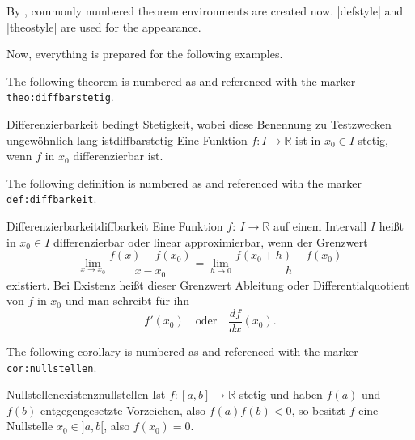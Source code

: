 
By , commonly numbered theorem environments are
created now. |defstyle| and |theostyle| are used for the appearance.

Now, everything is prepared for the following examples.

\begin{dispExample}
The following theorem is numbered as  and
referenced with the marker \texttt{theo:diffbarstetig}.

\begin{Theorem}{Differenzierbarkeit bedingt Stetigkeit, wobei diese Benennung
  zu Testzwecken ungew\"{o}hnlich lang ist}{diffbarstetig}%
  Eine Funktion $f:I\to\mathbb{R}$ ist in $x_0\in I$ stetig, wenn $f$ in
  $x_0$ differenzierbar ist.
\end{Theorem}
\end{dispExample}


\begin{dispExample}
The following definition is numbered as  and
referenced with the marker \texttt{def:diffbarkeit}.\bigskip

\begin{Definition}{Differenzierbarkeit}{diffbarkeit}
  Eine Funktion $f:~I\to\mathbb{R}$ auf einem Intervall $I$ hei\ss{}t in
  $x_0\in I$ differenzierbar oder linear approximierbar,
  wenn der Grenzwert
  \begin{equation*}
  \lim\limits_{x\to x_0}\frac{f(x)-f(x_0)}{x-x_0}=
  \lim\limits_{h\to 0}\frac{f(x_0+h)-f(x_0)}{h}
  \end{equation*}
  existiert. Bei Existenz hei\ss{}t dieser Grenzwert Ableitung
  oder Differentialquotient von $f$ in $x_0$ und man
  schreibt f\"{u}r ihn
  \begin{equation*}
  f'(x_0)\quad\text{oder}\quad\frac{df}{dx}(x_0).
  \end{equation*}
\end{Definition}
\end{dispExample}


\begin{dispExample}
The following corollary is numbered as  and
referenced with the marker \texttt{cor:nullstellen}.\bigskip

\begin{Corollary}{Nullstellenexistenz}{nullstellen}
  Ist $f:[a,b]\to\mathbb{R}$ stetig und haben $f(a)$ und $f(b)$ entgegengesetzte
  Vorzeichen, also $f(a)f(b)<0$, so besitzt $f$ eine Nullstelle $x_0\in]a,b[$,
  also $f(x_0)=0$.
\end{Corollary}
\end{dispExample}


